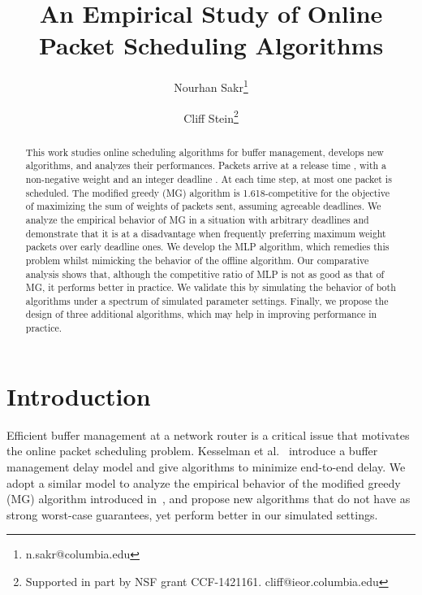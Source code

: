\documentclass[oribibl]{llncs}
\begin{document}
\title{An Empirical Study of Online Packet Scheduling Algorithms}
\author{Nourhan Sakr\thanks{n.sakr@columbia.edu} \and Cliff Stein\thanks{Supported in part by NSF grant CCF-1421161. cliff@ieor.columbia.edu}}

\maketitle


\begin{abstract}

This work studies online scheduling algorithms for
buffer management, develops new algorithms,
and analyzes their performances. Packets arrive at a release time
, with a non-negative weight  and an integer deadline .
At each time step, at most one packet is
scheduled. The modified greedy (MG) algorithm is 1.618-competitive for
the objective of maximizing the sum of weights of packets sent, assuming
agreeable deadlines. We
analyze the empirical behavior of MG in a situation with arbitrary deadlines and demonstrate that it is at a
disadvantage when frequently preferring maximum weight packets over
early deadline ones. We develop the MLP algorithm, which remedies this
problem whilst mimicking the behavior of the offline algorithm. Our
comparative analysis shows that, although the competitive ratio of MLP is not as good as that of MG, it performs better in practice. We validate this by
simulating the behavior of both algorithms under a
spectrum of simulated parameter settings. Finally, we propose the design of
three additional algorithms, which may help in
improving performance in practice.

\end{abstract}

\section{Introduction}
\label{sec:Introduction}


Efficient buffer management at a network router is a critical issue
that motivates the online packet scheduling problem. Kesselman et
al.~\cite{kesselman04} introduce a buffer management delay model and
give algorithms to minimize end-to-end delay.  We adopt a similar
model to analyze the empirical behavior of the modified greedy (MG)
algorithm introduced in~\cite{jez12}, and propose new algorithms that do not have 
as strong worst-case guarantees, yet perform better in our
simulated settings.
\end{document}
